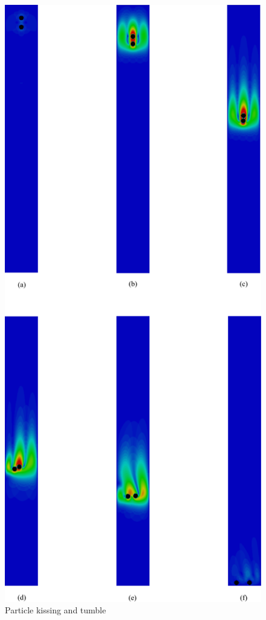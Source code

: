 \begin{figure}[tbhp]
\centering
\includegraphics[height=0.9\textheight]{kissing}
\caption{Particle kissing and tumble}
\label{fig:kissing}
\end{figure}

